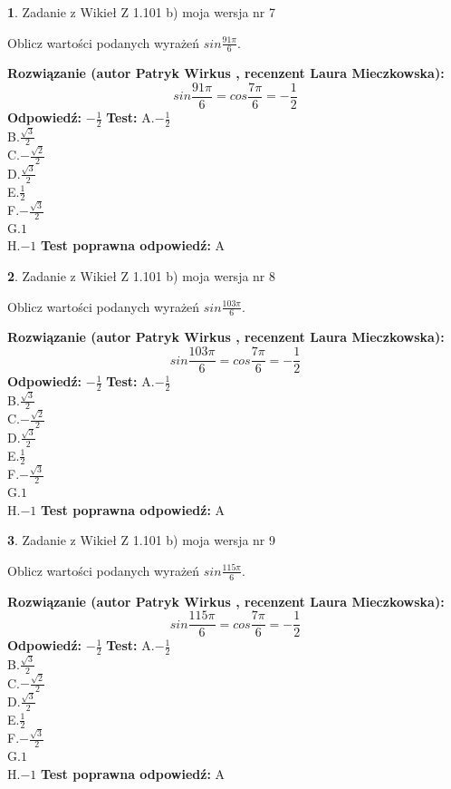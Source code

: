 \documentclass[12pt, a4paper]{article}
\theoremstyle{definition} %
\newtheorem{zad}{}
\newcommand{\zadStart}[1]{\begin{zad}#1\newline}
\newcommand{\zadStop}{\end{zad}}
\newcommand{\rozwStart}[2]{\noindent \textbf{Rozwiązanie (autor #1 , recenzent #2): }\newline}
\newcommand{\rozwStop}{\newline}
\newcommand{\odpStart}{\noindent \textbf{Odpowiedź:}\newline}
\newcommand{\odpStop}{\newline}
\newcommand{\testStart}{\noindent \textbf{Test:}\newline}
\newcommand{\testStop}{\newline}
\newcommand{\kluczStart}{\noindent \textbf{Test poprawna odpowiedź:}\newline}
\newcommand{\kluczStop}{\newline}
\begin{document}
\zadStart{Zadanie z Wikieł Z 1.101 b) moja wersja nr 7}

Oblicz wartości podanych wyrażeń $sin \frac{91\pi}{6}$.
\zadStop
\rozwStart{Patryk Wirkus}{Laura Mieczkowska}
$$sin \frac{91\pi}{6} = cos \frac{7\pi}{6} = -\frac{1}{2}$$
\rozwStop
\odpStart
$-\frac{1}{2}$
\odpStop
\testStart
A.$-\frac{1}{2}$\\
B.$\frac{\sqrt{3}}{2}$\\
C.$-\frac{\sqrt{2}}{2}$\\
D.$\frac{\sqrt{3}}{2}$\\
E.$\frac{1}{2}$\\
F.$-\frac{\sqrt{3}}{2}$\\
G.$1$\\
H.$-1$
\testStop
\kluczStart
A
\kluczStop



\zadStart{Zadanie z Wikieł Z 1.101 b) moja wersja nr 8}

Oblicz wartości podanych wyrażeń $sin \frac{103\pi}{6}$.
\zadStop
\rozwStart{Patryk Wirkus}{Laura Mieczkowska}
$$sin \frac{103\pi}{6} = cos \frac{7\pi}{6} = -\frac{1}{2}$$
\rozwStop
\odpStart
$-\frac{1}{2}$
\odpStop
\testStart
A.$-\frac{1}{2}$\\
B.$\frac{\sqrt{3}}{2}$\\
C.$-\frac{\sqrt{2}}{2}$\\
D.$\frac{\sqrt{3}}{2}$\\
E.$\frac{1}{2}$\\
F.$-\frac{\sqrt{3}}{2}$\\
G.$1$\\
H.$-1$
\testStop
\kluczStart
A
\kluczStop



\zadStart{Zadanie z Wikieł Z 1.101 b) moja wersja nr 9}

Oblicz wartości podanych wyrażeń $sin \frac{115\pi}{6}$.
\zadStop
\rozwStart{Patryk Wirkus}{Laura Mieczkowska}
$$sin \frac{115\pi}{6} = cos \frac{7\pi}{6} = -\frac{1}{2}$$
\rozwStop
\odpStart
$-\frac{1}{2}$
\odpStop
\testStart
A.$-\frac{1}{2}$\\
B.$\frac{\sqrt{3}}{2}$\\
C.$-\frac{\sqrt{2}}{2}$\\
D.$\frac{\sqrt{3}}{2}$\\
E.$\frac{1}{2}$\\
F.$-\frac{\sqrt{3}}{2}$\\
G.$1$\\
H.$-1$
\testStop
\kluczStart
A
\kluczStop
\end{document}
